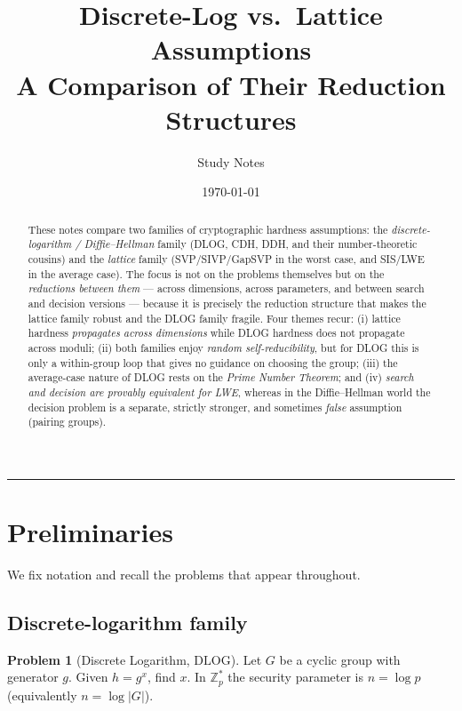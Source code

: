\documentclass[11pt]{article}
\title{\bfseries Discrete-Log vs.\ Lattice Assumptions\\[2pt]
\large A Comparison of Their Reduction Structures}
\author{Study Notes}
\date{\today}
\theoremstyle{definition}
\newtheorem{problem}[definition]{Problem}
\theoremstyle{plain}
\theoremstyle{remark}
\newcommand{\Z}{\mathbb{Z}}
\newcommand{\Zp}{\Z_p^*}
\newcommand{\dlog}{\mathrm{DLOG}}
\newcommand{\abs}[1]{\lvert #1 \rvert}
\begin{document}
\maketitle

\begin{abstract}
\noindent
These notes compare two families of cryptographic hardness assumptions:
the \emph{discrete-logarithm / Diffie--Hellman} family (DLOG, CDH, DDH, and their
number-theoretic cousins) and the \emph{lattice} family (SVP/SIVP/GapSVP in the worst case,
and SIS/LWE in the average case). The focus is not on the problems themselves but on the
\emph{reductions between them} --- across dimensions, across parameters, and between
search and decision versions --- because it is precisely the reduction structure that
makes the lattice family robust and the DLOG family fragile. Four themes recur:
(i) lattice hardness \emph{propagates across dimensions} while DLOG hardness does not
propagate across moduli; (ii) both families enjoy \emph{random self-reducibility},
but for DLOG this is only a within-group loop that gives no guidance on choosing the group;
(iii) the average-case nature of DLOG rests on the \emph{Prime Number Theorem};
and (iv) \emph{search and decision are provably equivalent for LWE}, whereas in the
Diffie--Hellman world the decision problem is a separate, strictly stronger, and sometimes
\emph{false} assumption (pairing groups).
\end{abstract}

\tableofcontents
\bigskip
\hrule

\section{Preliminaries}

We fix notation and recall the problems that appear throughout.

\subsection{Discrete-logarithm family}

\begin{problem}[Discrete Logarithm, $\dlog$]
Let $G$ be a cyclic group with generator $g$. Given $h = g^x$, find $x$.
In $\Zp$ the security parameter is $n = \log p$ (equivalently $n = \log\abs{G}$).
\end{problem}
\end{document}
